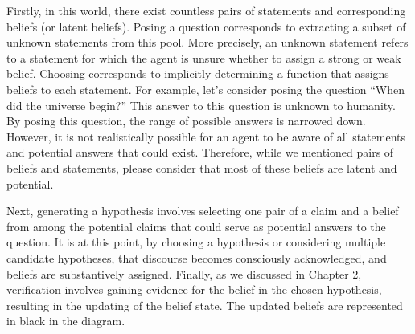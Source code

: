 \documentclass{book}
\begin{document}
Firstly, in this world, there exist countless pairs of statements and corresponding beliefs (or latent beliefs). Posing a question corresponds to extracting a subset of unknown statements from this pool. More precisely, an unknown statement refers to a statement for which the agent is unsure whether to assign a strong or weak belief. Choosing corresponds to implicitly determining a function that assigns beliefs to each statement. For example, let's consider posing the question ``When did the universe begin?'' This answer to this question is unknown to humanity. By posing this question, the range of possible answers is narrowed down. However, it is not realistically possible for an agent to be aware of all statements and potential answers that could exist. Therefore, while we mentioned pairs of beliefs and statements, please consider that most of these beliefs are latent and potential.

Next, generating a hypothesis involves selecting one pair of a claim and a belief from among the potential claims that could serve as potential answers to the question. It is at this point, by choosing a hypothesis or considering multiple candidate hypotheses, that discourse becomes consciously acknowledged, and beliefs are substantively assigned. Finally, as we discussed in Chapter 2, verification involves gaining evidence for the belief in the chosen hypothesis, resulting in the updating of the belief state. The updated beliefs are represented in black in the diagram.
\end{document}
